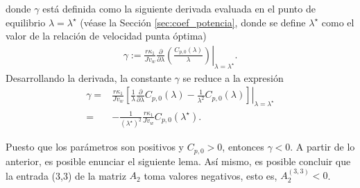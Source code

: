 donde $\gamma$ está definida como la siguiente derivada evaluada en el punto de
equilibrio $\lambda=\lambda^\star$ (véase la Sección \ref{sec:coef_potencia}, donde se define
$\lambda^\star$ como el valor de la relación de velocidad punta óptima)
\begin{align}\nonumber
	\gamma:= \frac{r\kappa_1}{Jv_w}\left.\frac{\partial}{\partial \lambda}
	\left(\frac{C_{p,0}(\lambda)}{\lambda}\right)\right|_{\lambda=\lambda^\star}.
\end{align}
Desarrollando la derivada, la constante $\gamma$ se reduce a la expresión
\begin{align}
	\gamma=&\left.\frac{r\kappa_1}{Jv_w}
	\left[\frac{1}{\lambda}\frac{\partial }{\partial \lambda}C_{p,0}(\lambda)
	-\frac{1}{\lambda^2}C_{p,0}(\lambda)\right]\right|_{\lambda=\lambda^\star}\nonumber\\
	=& - \frac{1}{(\lambda^\star)^2}\frac{r\kappa_1}{Jv_w} C_{p,0}(\lambda^\star). \label{eq:gamma}
\end{align}


Puesto que los parámetros son positivos y $C_{p,0}>0$, entonces $\gamma<0$. A partir de lo anterior, 
es posible enunciar el siguiente lema. Así mismo, es posible concluir que la entrada (3,3) de la 
matriz $A_2$ toma valores negativos, esto es, $A_{2}^{(3,3)}<0$.\\

